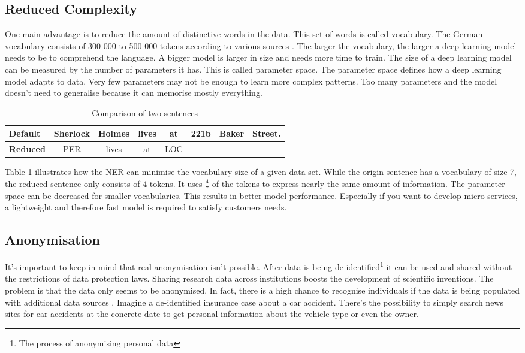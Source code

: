 \subsection{Reduced Complexity}

One main advantage is to reduce the amount of distinctive words in the data. This set of words is called vocabulary. The German vocabulary consists of 300 000 to 500 000 tokens according to various sources \cite{wiki03}. The larger the vocabulary, the larger a deep learning model needs to be to comprehend the language. A bigger model is larger in size and needs more time to train. The size of a deep learning model can be measured by the number of parameters it has. This is called parameter space. The parameter space defines how a deep learning model adapts to data. Very few parameters may not be enough to learn more complex patterns. Too many parameters and the model doesn't need to generalise because it can memorise mostly everything.

\begin{table}[h!]
    \centering
    \begin{tabular}{|l|c|c|c|c|c|c|c|}
        \hline
        \textbf{Default} & Sherlock & Holmes & lives & at & 221b & Baker & Street. \\
        \hline
        \textbf{Reduced} & PER & lives & at & LOC & & & \\
        \hline
    \end{tabular}
    \caption{Comparison of two sentences}
    \label{tbl:param-space}
\end{table}

Table \ref{tbl:param-space} illustrates how the NER can minimise the vocabulary size of a given data set. While the origin sentence has a vocabulary of size 7, the reduced sentence only consists of 4 tokens. It uses $\frac{4}{7}$ of the tokens to express nearly the same amount of information. The parameter space can be decreased for smaller vocabularies. This results in better model performance. Especially if you want to develop micro services, a lightweight and therefore fast model is required to satisfy customers needs.

\subsection{Anonymisation}

It's important to keep in mind that real anonymisation isn't possible. After data is being de-identified\footnote{The process of anonymising personal data} it can be used and shared without the restrictions of data protection laws. Sharing research data across institutions boosts the development of scientific inventions. The problem is that the data only seems to be anonymised. In fact, there is a high chance to recognise individuals if the data is being populated with additional data sources \cite{rocher19}. Imagine a de-identified insurance case about a car accident. There's the possibility to simply search news sites for car accidents at the concrete date to get personal information about the vehicle type or even the owner.

